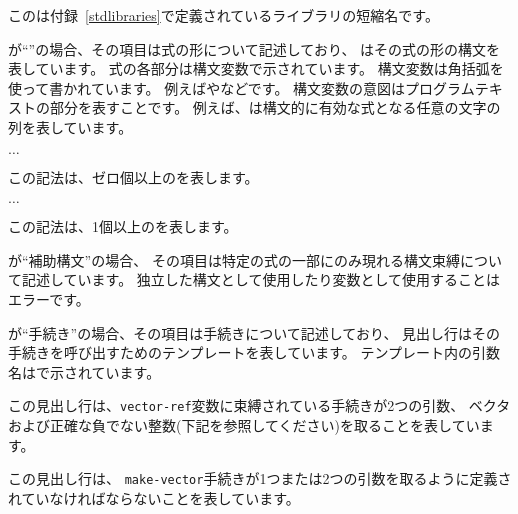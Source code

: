 このは付録~\ref{stdlibraries}で定義されているライブラリの短縮名です。

が``\exprtype''の場合、その項目は式の形について記述しており、
はその式の形の構文を表しています。
式の各部分は構文変数で示されています。
構文変数は角括弧を使って書かれています。
例えばやなどです。
構文変数の意図はプログラムテキストの部分を表すことです。
例えば、は構文的に有効な式となる任意の文字の列を表しています。
\begin{tabbing}
\qquad {} $\ldots$
\end{tabbing}
この記法は、ゼロ個以上のを表します。
\begin{tabbing}
\qquad {}  $\ldots$
\end{tabbing}
この記法は、1個以上のを表します。

が``補助構文''の場合、
その項目は特定の式の一部にのみ現れる構文束縛について記述しています。
独立した構文として使用したり変数として使用することはエラーです。

が``手続き''の場合、その項目は手続きについて記述しており、
見出し行はその手続きを呼び出すためのテンプレートを表しています。
テンプレート内の引数名はで示されています。

\noindent{}\unpenalty

この見出し行は、{\tt vector-ref}変数に束縛されている手続きが2つの引数、
ベクタおよび正確な負でない整数(下記を参照してください)を取ることを表しています。

\noindent%
\unpenalty

この見出し行は、
{\tt make-vector}手続きが1つまたは2つの引数を取るように定義されていなければならないことを表しています。

